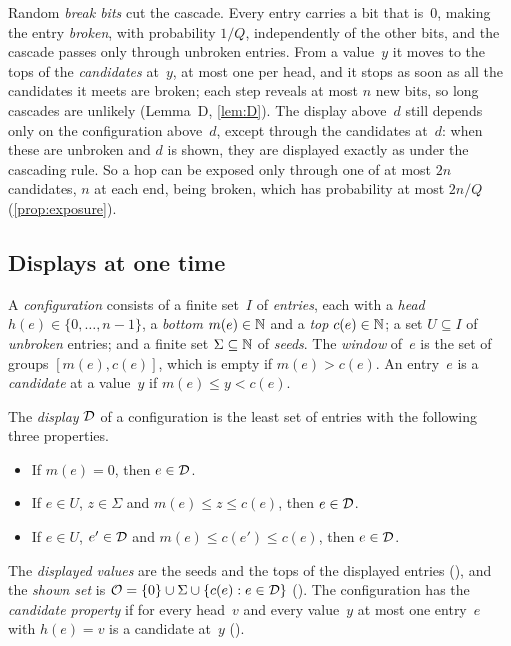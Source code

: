 Random \emph{break bits} cut the cascade. Every entry carries a bit that is~$0$, making the entry \emph{broken}, with probability
$1/Q$, independently of the other bits, and the cascade passes only through unbroken entries. From a value~$y$ it moves to the
tops of the \emph{candidates} at~$y$, at most one per head, and it stops as soon as all the candidates it meets are broken; each
step reveals at most $n$ new bits, so long cascades are unlikely (Lemma~D, \cref{lem:D}). The display above~$d$ still depends only
on the configuration above~$d$, except through the candidates at~$d$: when these are unbroken and $d$ is shown, they are displayed
exactly as under the cascading rule. So a hop can be exposed only through one of at most $2n$ candidates, $n$ at each end, being
broken, which has probability at most $2n/Q$ (\cref{prop:exposure}).

\subsection{Displays at one time}\label{sec:displays-one}

A \emph{configuration} consists of a finite set~$I$ of \emph{entries}, each with a \emph{head} $h(e)\in\{0,\dots,n-1\}$, a
\emph{bottom} $m(e)\in\mathbb{N}$ and a \emph{top} $c(e)\in\mathbb{N}$; a set $U\subseteq I$ of \emph{unbroken} entries; and a finite set
$\Sigma\subseteq\mathbb{N}$ of \emph{seeds}. The \emph{window} of~$e$ is the set of groups $[m(e),c(e)]$, which is empty if $m(e)>c(e)$. An
entry~$e$ is a \emph{candidate} at a value~$y$ if $m(e)\le y<c(e)$.

\begin{definition}[Displays]\label{def:display}
The \emph{display} $\mathcal{D}$ of a configuration is the least set of entries with the following three properties.
\begin{itemize}[leftmargin=3em]
\item[\textup{(Z)}] If $m(e)=0$, then $e\in\mathcal{D}$.
\item[\textup{(S)}] If $e\in U$, $z\in\Sigma$ and $m(e)\le z\le c(e)$, then $e\in\mathcal{D}$.
\item[\textup{(C)}] If $e\in U$, $e'\in\mathcal{D}$ and $m(e)\le c(e')\le c(e)$, then $e\in\mathcal{D}$.
\end{itemize}
The \emph{displayed values} are the seeds and the tops of the displayed entries (), and the \emph{shown set} is
$\mathcal{O}=\{0\}\cup\Sigma\cup\{c(e):e\in\mathcal{D}\}$ (). The configuration has the \emph{candidate property} if for every
head~$v$ and every value~$y$ at most one entry~$e$ with $h(e)=v$ is a candidate at~$y$ ().
\end{definition}

